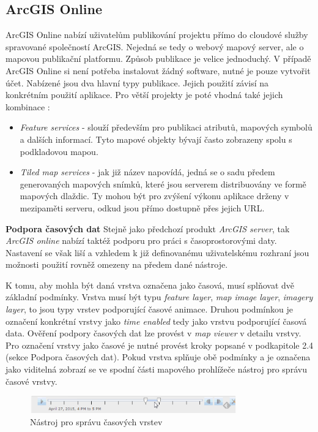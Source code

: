 \subsection{ArcGIS Online}

ArcGIS Online nabízí uživatelům publikování projektu přímo do cloudové
služby spravované společností ArcGIS. Nejedná se tedy o webový mapový server, ale o mapovou publikační platformu.
Způsob publikace je velice jednoduchý. V případě ArcGIS Online si není potřeba instalovat žádný software, nutné
je pouze vytvořit účet. Nabízené jsou dva hlavní typy
publikace. Jejich použití závisí na konkrétním použití aplikace. Pro
větší projekty je poté vhodná také jejich kombinace
\cite{arcgis-publishing-service}:
\begin{itemize}
	\item \textit{Feature services} - slouží především pro
publikaci atributů, mapových symbolů a dalších informací. Tyto mapové
objekty bývají často zobrazeny spolu s podkladovou mapou.
	\item \textit{Tiled map services} - jak již název napovídá,
jedná se o sadu předem generovaných mapových snímků, které jsou
serverem distribuovány ve formě mapových dlaždic. Ty mohou být pro
zvýšení výkonu aplikace drženy v mezipaměti serveru, odkud jsou přímo
dostupně přes jejich URL.
\end{itemize}

\bigskip
\noindent \textbf{Podpora časových dat} Stejně jako předchozí produkt
\textit{ArcGIS server}, tak \textit{ArcGIS online} nabízí taktéž
podporu pro práci s časoprostorovými daty. Nastavení se však liší a
vzhledem k již definovanému uživatelskému rozhraní jsou možnosti
použití rovněž omezeny na předem dané nástroje.

K tomu, aby mohla být daná vrstva označena jako časová, musí splňovat
dvě základní podmínky. Vrstva musí být typu \textit{feature layer},
\textit{map image layer}, \textit{imagery layer}, to jsou typy vrstev
podporující časové animace. Druhou podmínkou je označení konkrétní
vrstvy jako \textit{time enabled} tedy jako vrstvu podporující časová
data. Ověření podpory časových dat lze provést v \textit{map viewer} v
detailu vrstvy. Pro označení vrstvy jako časové je nutné provést kroky
popsané v podkapitole 2.4 (sekce Podpora časových dat). Pokud vrstva
splňuje obě podmínky a je označena jako viditelná zobrazí se ve spodní
části mapového prohlížeče nástroj pro správu časové vrstvy.

\begin{figure}[h!]  \centering
\includegraphics[width=0.8\textwidth]{./img/arcgis-online-time-slider.png}
	\caption{Nástroj pro správu časových vrstev \cite{arcgis-publishing-service}}
	\label{fig:arcgis-time-slider}
\end{figure}

